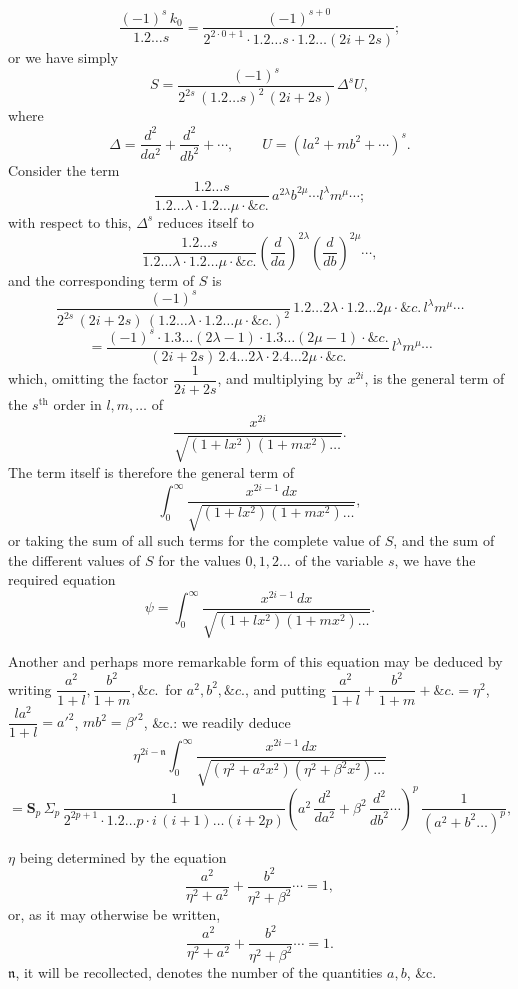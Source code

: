 \documentclass[11pt]{article}
\begin{document}
\[
\frac{(-1)^{s}\,k_{0}}{1.2\ldots s} = \frac{(-1)^{s+0}}{2^{2 \cdot 0 + 1}\cdot 1.2\ldots s\cdot 1.2\ldots (2i + 2s)};
\]
or we have simply
\[
S = \frac{(-1)^{s}}{2^{2s}\,(1.2\ldots s)^{2}\,(2i + 2s)}\,\Delta^{s}U,
\]
where
\[
\Delta = \frac{d^2}{da^2} + \frac{d^2}{db^2} + \cdots,\qquad U = (la^2 + mb^2 + \cdots)^{s}.
\]
Consider the term
\[
\frac{1.2\ldots s}{1.2\ldots\lambda\cdot 1.2\ldots\mu\cdot\&c.}\,a^{2\lambda}b^{2\mu}\cdots l^{\lambda}m^{\mu}\cdots;
\]
with respect to this, $\Delta^{s}$ reduces itself to
\[
\frac{1.2\ldots s}{1.2\ldots\lambda\cdot 1.2\ldots\mu\cdot\&c.}\left(\frac{d}{da}\right)^{2\lambda}\left(\frac{d}{db}\right)^{2\mu}\cdots,
\]
and the corresponding term of $S$ is
\[
\frac{(-1)^{s}}{2^{2s}\,(2i + 2s)\,(1.2\ldots\lambda\cdot 1.2\ldots\mu\cdot\&c.)^{2}}\,1.2\ldots 2\lambda\cdot 1.2\ldots 2\mu\cdot\&c.\,l^{\lambda}m^{\mu}\cdots
\]
\[
= \frac{(-1)^{s}\cdot 1.3\ldots(2\lambda - 1)\cdot 1.3\ldots(2\mu - 1)\cdot\&c.}{(2i + 2s)\,2.4\ldots 2\lambda\cdot 2.4\ldots 2\mu\cdot\&c.}\,l^{\lambda}m^{\mu}\cdots
\]
which, omitting the factor $\dfrac{1}{2i + 2s}$, and multiplying by $x^{2i}$, is the general term of the $s^{\text{th}}$ order in $l, m, \ldots$ of
\[
\frac{x^{2i}}{\sqrt{(1 + lx^2)(1 + mx^2)\ldots}}.
\]
The term itself is therefore the general term of
\[
\int_{0}^{\infty}\frac{x^{2i-1}\,dx}{\sqrt{(1 + lx^2)(1 + mx^2)\ldots}},
\]
or taking the sum of all such terms for the complete value of $S$, and the sum of the different values of $S$ for the values $0, 1, 2 \ldots$ of the variable $s$, we have the required equation
\[
\psi = \int_{0}^{\infty}\frac{x^{2i-1}\,dx}{\sqrt{(1 + lx^2)(1 + mx^2)\ldots}}.
\]

\medskip

Another and perhaps more remarkable form of this equation may be deduced by writing $\dfrac{a^2}{1 + l}, \dfrac{b^2}{1 + m}, \&c.$\ for $a^2, b^2, \&c.$, and putting $\dfrac{a^2}{1 + l} + \dfrac{b^2}{1 + m} + \&c. = \eta^2$, $\dfrac{l a^2}{1+l} = a'^2$, $m b^2 = \beta'^2$, \&c.: we readily deduce
\[
\eta^{2i - \mathfrak{n}}\int_{0}^{\infty}\frac{x^{2i-1}\,dx}{\sqrt{(\eta^2 + a^2 x^2)(\eta^2 + \beta^2 x^2)\ldots}}
\]
\[
= \boldsymbol{S}_{p}\,\Sigma_{p}\,\frac{1}{2^{2p+1}\cdot 1.2\ldots p\cdot i\,(i+1)\ldots(i + 2p)}\left(a^2\,\frac{d^2}{da^2} + \beta^2\,\frac{d^2}{db^2}\cdots\right)^{p}\,\frac{1}{(a^2 + b^2 \ldots)^{p}},
\]

\clearpage

$\eta$ being determined by the equation
\[
\frac{a^2}{\eta^2 + a^2} + \frac{b^2}{\eta^2 + \beta^2}\cdots = 1,
\]
or, as it may otherwise be written,
\[
\frac{a^2}{\eta^2 + a^2} + \frac{b^2}{\eta^2 + \beta^2}\cdots = 1.
\]
$\mathfrak{n}$, it will be recollected, denotes the number of the quantities $a, b$, \&c.
\end{document}
